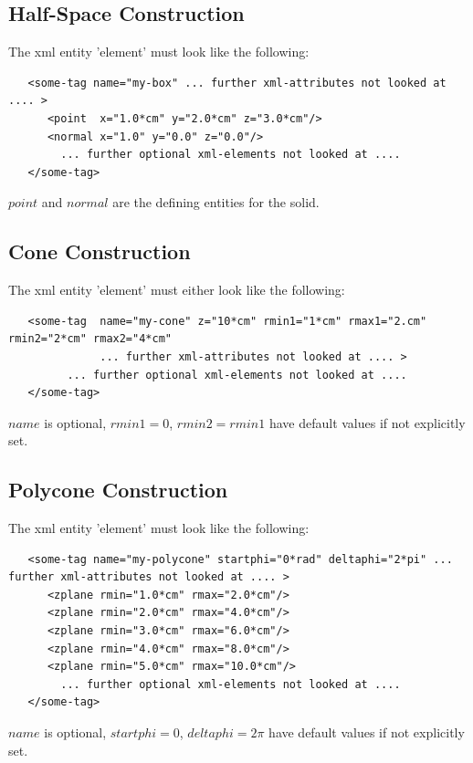 \subsection{Half-Space Construction}
\label{sec:dd4hep-manual-plugin-half-space-shape}

The xml entity 'element' must look like the following:
\begin{verbatim}
   <some-tag name="my-box" ... further xml-attributes not looked at .... >
      <point  x="1.0*cm" y="2.0*cm" z="3.0*cm"/>
      <normal x="1.0" y="0.0" z="0.0"/>
        ... further optional xml-elements not looked at .... 
   </some-tag>
\end{verbatim}
$point$ and $normal$ are the defining entities for the solid.

\subsection{Cone Construction}
\label{sec:dd4hep-manual-plugin-cone-shape}

The xml entity 'element' must either look like the following:
\begin{verbatim}
   <some-tag  name="my-cone" z="10*cm" rmin1="1*cm" rmax1="2.cm" rmin2="2*cm" rmax2="4*cm" 
              ... further xml-attributes not looked at .... >
         ... further optional xml-elements not looked at .... 
   </some-tag>
\end{verbatim}
$name$ is optional, $rmin1=0$, $rmin2=rmin1$ have default values if not explicitly set.

\subsection{Polycone Construction}
\label{sec:dd4hep-manual-plugin-polycone-shape}

The xml entity 'element' must look like the following:
\begin{verbatim}
   <some-tag name="my-polycone" startphi="0*rad" deltaphi="2*pi" ... further xml-attributes not looked at .... >
      <zplane rmin="1.0*cm" rmax="2.0*cm"/>
      <zplane rmin="2.0*cm" rmax="4.0*cm"/>
      <zplane rmin="3.0*cm" rmax="6.0*cm"/>
      <zplane rmin="4.0*cm" rmax="8.0*cm"/>
      <zplane rmin="5.0*cm" rmax="10.0*cm"/>
        ... further optional xml-elements not looked at .... 
   </some-tag>
\end{verbatim}
$name$ is optional, $startphi=0$, $deltaphi=2\pi$ have default values if not explicitly set.

